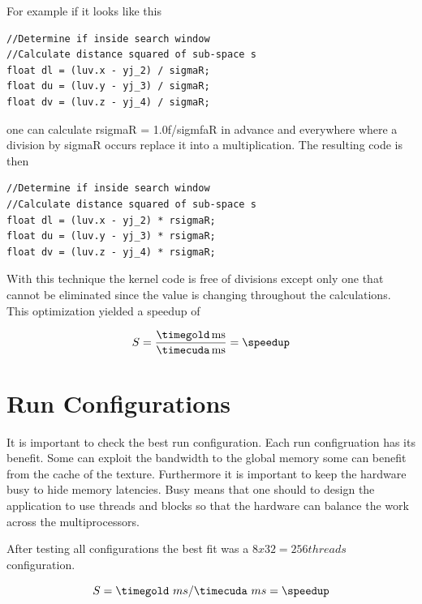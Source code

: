 For example if it looks like this
\begin{lstlisting}[caption=Expensive divison, label=lst:division]
//Determine if inside search window
//Calculate distance squared of sub-space s
float dl = (luv.x - yj_2) / sigmaR;               
float du = (luv.y - yj_3) / sigmaR;               
float dv = (luv.z - yj_4) / sigmaR;
\end{lstlisting}
one can calculate \textsf{rsigmaR} = 1.0f/\textsf{sigmfaR} in advance and everywhere where a
division by \textsf{sigmaR} occurs replace it into a multiplication. The
resulting code is then
\begin{lstlisting}[caption=Division turned into fast multiplication, label=lst:precalcdivision]
//Determine if inside search window
//Calculate distance squared of sub-space s
float dl = (luv.x - yj_2) * rsigmaR;               
float du = (luv.y - yj_3) * rsigmaR;               
float dv = (luv.z - yj_4) * rsigmaR;
\end{lstlisting}

With this technique the kernel code is free of divisions except only one that
cannot be eliminated since the value is changing throughout the calculations.
This optimization yielded a speedup of

\fpDiv{\speedup}{\timegold}{\timecuda}
\begin{equation*}\label{eq:speedup3}
	S = \frac{\unit[\timegold]{ms}}{\unit[\timecuda]{ms}} = \speedup
\end{equation*}


\section{Run Configurations} %
\label{sec:run_configurations}

It is important to check the best run configuration. Each run configruation 
has its benefit. Some can exploit the bandwidth to the global memory some can
benefit from the cache of the texture. Furthermore it is important to keep the
hardware busy to hide memory latencies. Busy means that one should to design 
the application to use threads and blocks so that the hardware can balance the 
work across the multiprocessors. 

After testing all configurations the 
best fit was a $8x32=256 threads$ configuration.

\fpDiv{\speedup}{\timegold}{\timecuda}
\begin{equation*}\label{eq:speedup4}
	S = \timegold\ ms/\timecuda\ ms = \speedup
\end{equation*}


